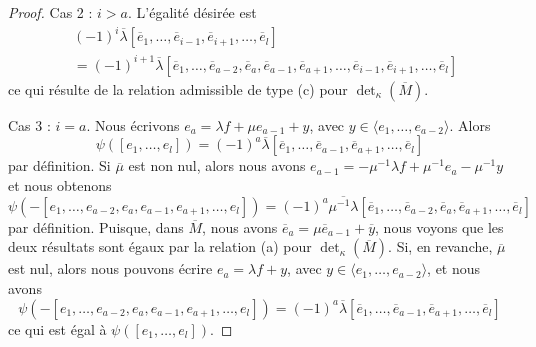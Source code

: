 \begin{proof}
\medskip\noindent
Cas 2 : $i > a$. L'égalité désirée est
\begin{align*}
& (-1)^i
\overline{\lambda}
[\overline{e}_1,
\ldots,
\overline{e}_{i - 1},
\overline{e}_{i + 1},
\ldots,
\overline{e}_l] \\
& =
(-1)^{i + 1}
\overline{\lambda}
[\overline{e}_1,
\ldots,
\overline{e}_{a - 2},
\overline{e}_a,
\overline{e}_{a - 1},
\overline{e}_{a + 1},
\ldots,
\overline{e}_{i - 1},
\overline{e}_{i + 1},
\ldots,
\overline{e}_l]
\end{align*}
ce qui résulte de la relation admissible de type (c) pour
$\det_\kappa(\overline{M})$.

\medskip\noindent
Cas 3 : $i = a$. Nous écrivons $e_a = \lambda f + \mu e_{a - 1} + y$,
avec $y \in \langle e_1, \ldots, e_{a - 2}\rangle$. Alors
$$
\psi([e_1, \ldots, e_l]) =
(-1)^a
\overline{\lambda}
[\overline{e}_1,
\ldots,
\overline{e}_{a - 1},
\overline{e}_{a + 1},
\ldots,
\overline{e}_l]
$$
par définition. Si $\overline{\mu}$ est non nul, alors nous avons
$e_{a - 1} = - \mu^{-1} \lambda f + \mu^{-1}e_a - \mu^{-1} y$
et nous obtenons
$$
\psi(-[e_1, \ldots, e_{a - 2}, e_a, e_{a - 1}, e_{a + 1}, \ldots, e_l]) =
(-1)^a
\overline{\mu^{-1}\lambda}
[\overline{e}_1,
\ldots,
\overline{e}_{a - 2},
\overline{e}_a,
\overline{e}_{a + 1},
\ldots,
\overline{e}_l]
$$
par définition. Puisque, dans $\overline{M}$, nous avons
$\overline{e}_a = \mu \overline{e}_{a - 1} + \overline{y}$, nous voyons
que les deux résultats sont égaux par la relation (a) pour $\det_\kappa(\overline{M})$.
Si, en revanche, $\overline{\mu}$ est nul, alors nous pouvons écrire
$e_a = \lambda f + y$, avec $y \in \langle e_1, \ldots, e_{a - 2}\rangle$,
et nous avons
$$
\psi(-[e_1, \ldots, e_{a - 2}, e_a, e_{a - 1}, e_{a + 1}, \ldots, e_l]) =
(-1)^a
\overline{\lambda}
[\overline{e}_1,
\ldots,
\overline{e}_{a - 1},
\overline{e}_{a + 1},
\ldots,
\overline{e}_l]
$$
ce qui est égal à $\psi([e_1, \ldots, e_l])$.


\end{proof}
